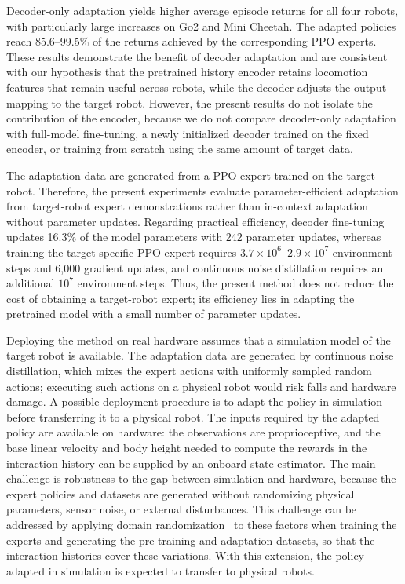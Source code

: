 \documentclass[runningheads]{llncs}
\begin{document}
Decoder-only adaptation yields higher average episode returns for all four robots, with particularly large increases on Go2 and Mini Cheetah.
The adapted policies reach 85.6--99.5\% of the returns achieved by the corresponding PPO experts.
These results demonstrate the benefit of decoder adaptation and are consistent with our hypothesis that the pretrained history encoder retains locomotion features that remain useful across robots, while the decoder adjusts the output mapping to the target robot.
However, the present results do not isolate the contribution of the encoder, because we do not compare decoder-only adaptation with full-model fine-tuning, a newly initialized decoder trained on the fixed encoder, or training from scratch using the same amount of target data.

The adaptation data are generated from a PPO expert trained on the target robot.
Therefore, the present experiments evaluate parameter-efficient adaptation from target-robot expert demonstrations rather than in-context adaptation without parameter updates.
Regarding practical efficiency, decoder fine-tuning updates 16.3\% of the model parameters with 242 parameter updates, whereas training the target-specific PPO expert requires $3.7\times10^6$--$2.9\times10^7$ environment steps and 6,000 gradient updates, and continuous noise distillation requires an additional $10^7$ environment steps.
Thus, the present method does not reduce the cost of obtaining a target-robot expert; its efficiency lies in adapting the pretrained model with a small number of parameter updates.

Deploying the method on real hardware assumes that a simulation model of the target robot is available.
The adaptation data are generated by continuous noise distillation, which mixes the expert actions with uniformly sampled random actions; executing such actions on a physical robot would risk falls and hardware damage.
A possible deployment procedure is to adapt the policy in simulation before transferring it to a physical robot.
The inputs required by the adapted policy are available on hardware: the observations are proprioceptive, and the base linear velocity and body height needed to compute the rewards in the interaction history can be supplied by an onboard state estimator.
The main challenge is robustness to the gap between simulation and hardware, because the expert policies and datasets are generated without randomizing physical parameters, sensor noise, or external disturbances.
This challenge can be addressed by applying domain randomization~\cite{8202133,8460528} to these factors when training the experts and generating the pre-training and adaptation datasets, so that the interaction histories cover these variations.
With this extension, the policy adapted in simulation is expected to transfer to physical robots.
\end{document}
